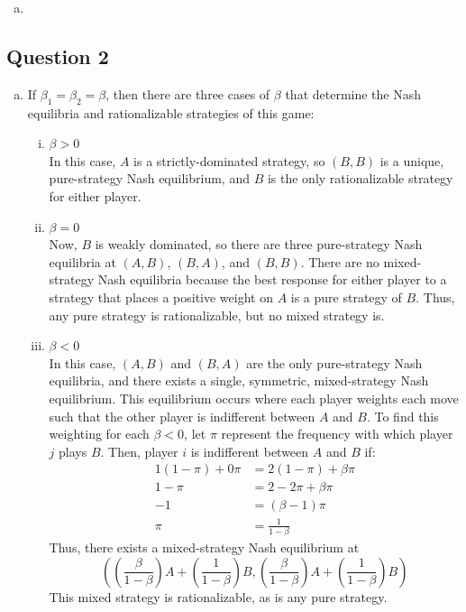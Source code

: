 \documentclass{article}
\begin{document}
\begin{enumerate}[(a)]
	\item %
	
	
\end{enumerate}




\subsection*{Question 2}

\begin{enumerate}[(a)]
	\item If $\beta_1=\beta_2=\beta$, then there are three cases of $\beta$ that determine the Nash equilibria and rationalizable strategies of this game:
		\begin{enumerate}[(i)]
			\item ${\beta>0}$ \\
				In this case, $A$ is a strictly-dominated strategy, so $(B,B)$ is a unique, pure-strategy Nash equilibrium, and $B$ is the only rationalizable strategy for either player.
				
			\item ${\beta=0}$ \\
				Now, $B$ is weakly dominated, so there are three pure-strategy Nash equilibria at $(A,B)$, $(B,A)$, and $(B,B)$. There are no mixed-strategy Nash equilibria because the best response for either player to a strategy that places a positive weight on $A$ is a pure strategy of $B$. Thus, any pure strategy is rationalizable, but no mixed strategy is.
			
			\item ${\beta<0}$ \\
				In this case, $(A,B)$ and $(B,A)$ are the only pure-strategy Nash equilibria, and there exists a single, symmetric, mixed-strategy Nash equilibrium. This equilibrium occurs where each player weights each move such that the other player is indifferent between $A$ and $B$. To find this weighting for each ${\beta<0}$, let $\pi$ represent the frequency with which player $j$ plays $B$. Then, player $i$ is indifferent between $A$ and $B$ if:
					\begin{align*}
						1(1-\pi) + 0\pi &= 2(1-\pi) + \beta\pi	\\
						1 - \pi &= 2 - 2\pi + \beta\pi 	\\
						-1 &= (\beta-1)\pi 	\\
						\pi &= \frac{1}{1-\beta}
					\end{align*}
				Thus, there exists a mixed-strategy Nash equilibrium at 
				\[
					\left(\left(\frac{\beta}{1-\beta}\right)A + \left(\frac{1}{1-\beta}\right)B,\left(\frac{\beta}{1-\beta}\right)A+\left(\frac{1}{1-\beta}\right)B\right)
				\]
				This mixed strategy is rationalizable, as is any pure strategy.
			

\end{enumerate}
\end{enumerate}
\end{document}
